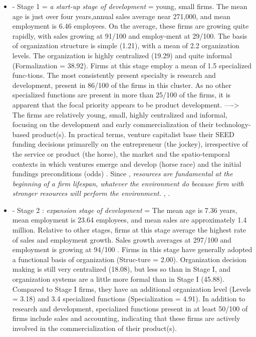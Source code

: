 \begin{itemize}
  \item - Stage 1 = \textit{a start-up stage of development} = young, small firms. The mean age is just over four years,annual sales average near 271,000, and mean employment is 6.46 employees. On the average, these firms are growing quite rapidly, with sales growing at 91/100 and employ-ment at 29/100. The basis of organization structure is simple (1.21), with a mean of 2.2 organization levels. The organization is highly centralized (19.29) and quite informal (Formalization = 38.92). Firms at this stage employ a mean of 1.5 specialized func-tions. The most consistently present specialty is research and development, present in 86/100 of the firms in this cluster. As no other specialized functions are present in more than 25/100 of the firms, it is apparent that the focal priority appears to be product development.
  ----> The firms are relatively young, small, highly centralized and informal, focusing on the development and early commercialization of their technology-based product(s).
        In practical terms, venture capitalist base their SEED funding decisions primarelly on the entrepreneur (the jockey), irrespective of the service or product (the horse), the market and the spatio-temporal contexts in which ventures emerge and develop (horse race) and the initial fundings preconditions (odds) \citep{macmillan1985criteria}.
  Since \citep{cooper1994initial}, \textit{resources are fundamental at the beginning of a firm lifespan, whatever the environment do because firm with stronger resources will perform the environment.} \citep{cooper1994initial}, .
  \item - Stage 2 : \textit{expansion stage of development} = The mean age is 7.36 years, mean employment is 23.64 employees, and mean sales are approximately 1.4 million. Relative to other stages, firms at this stage average the highest rate of sales and employment growth. Sales growth averages at 297/100 and employment is growing at 94/100 . Firms in this stage have generally adopted a functional basis of organization (Struc-ture = 2.00). Organization decision making is still very centralized (18.08), but less so than in Stage I, and organization systems are a little more formal than in Stage I (45.88). Compared to Stage I firms, they have an additional organization level (Levels = 3.18) and 3.4 specialized functions (Specialization = 4.91). In addition to research and development, specialized functions present in at least 50/100  of firms include sales and accounting, indicating that these firms are actively involved in the commercialization of their product(s).

\end{itemize}
